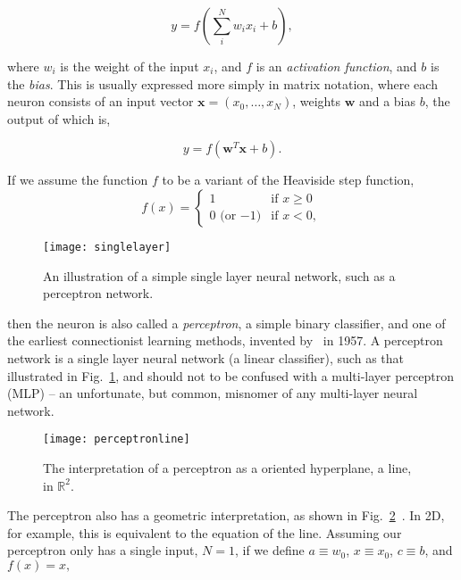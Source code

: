 \documentclass[thesis]{subfiles}
\begin{document}
\begin{equation}
	y = f\left(\sum_{i}^{N} w_i x_i + b\right),
\end{equation}

where $w_i$ is the weight of the input $x_i$, and $f$ is an \emph{activation function}, and $b$ is the \emph{bias}. This is usually expressed more simply in matrix notation, where each neuron consists of an input vector $\mathbf{x}=(x_0,\ldots,x_N)$, weights $\mathbf{w}$ and a bias $b$, the output of which is, %

\begin{equation}
    y = f\left(\mathbf{w}^T\mathbf{x} + b \right).
\end{equation}

If we assume the function $f$ to be a variant of the Heaviside step function,
\begin{equation}
    f(x) = 
\begin{cases}
1 & \text{if } x \geq 0\\
0 \textrm{ (or $-1$)} & \text{if } x < 0,
\end{cases}
\end{equation}

\begin{figure}[tbp]
\centering
\texttt{[image: singlelayer]}
\caption[A single layer neural network]{An illustration of a simple single layer neural network, such as a perceptron network.}
\label{fig:singlelayer}
\end{figure}
then the neuron is also called a \emph{perceptron}, a simple binary classifier, and one of the earliest connectionist learning methods, invented by~\citet{rosenblatt1958perceptron} in 1957. A perceptron network is a single layer neural network (\ie a linear classifier), such as that illustrated in Fig.~\ref{fig:singlelayer}, and should not to be confused with a multi-layer perceptron (MLP) -- an unfortunate, but common, misnomer of any multi-layer neural network.
\begin{figure}[tbp]
\centering
\texttt{[image: perceptronline]}
\caption[The interpretation of a perceptron as a hyperplane]{The interpretation of a perceptron as a oriented hyperplane, \ie a line, in $\mathbb{R}^2$.}
\label{fig:hyperplane}
\end{figure}
The perceptron also has a geometric interpretation, as shown in Fig.~\ref{fig:hyperplane}~\citet{Bishop1995}. In 2D, for example, this is equivalent to the equation of the line. Assuming our perceptron only has a single input, \ie $N=1$, if we define $a\equiv w_0$, $x \equiv x_0$, $c \equiv b$, and $f(x) = x,$
\end{document}

